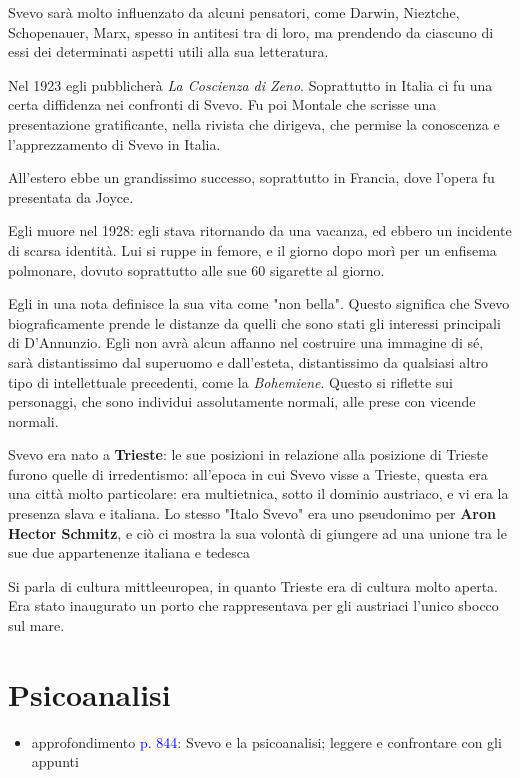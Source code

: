 \documentclass[a4paper, twoside, titlepage]{book}
\newcommand{\elenco}[1]{%
\begin{itemize}
#1
\end{itemize}}
\renewcommand{\emph}[1]{\textcolor{blue}{#1}}
\begin{document}
Svevo sarà molto influenzato da alcuni pensatori, come Darwin, Nieztche, Schopenauer, Marx, spesso in antitesi tra di loro, ma prendendo da ciascuno di essi dei determinati aspetti utili alla sua letteratura.

Nel 1923 egli pubblicherà \textit{La Coscienza di Zeno}. Soprattutto in Italia ci fu una certa diffidenza nei confronti di Svevo. Fu poi Montale che scrisse una presentazione gratificante, nella rivista che dirigeva, che permise la conoscenza e l'apprezzamento di Svevo in Italia.

All'estero ebbe un grandissimo successo, soprattutto in Francia, dove l'opera fu presentata da Joyce.

Egli muore nel 1928: egli stava ritornando da una vacanza, ed ebbero un incidente di scarsa identità. Lui si ruppe in femore, e il giorno dopo morì per un enfisema polmonare, dovuto soprattutto alle sue 60 sigarette al giorno.

Egli in una nota definisce la sua vita come "non bella". Questo significa che Svevo biograficamente prende le distanze da quelli che sono stati gli interessi principali di D'Annunzio.
Egli non avrà alcun affanno nel costruire una immagine di sé, sarà distantissimo dal superuomo e dall'esteta, distantissimo da qualsiasi altro tipo di intellettuale precedenti, come la \textit{Bohemiene}. Questo si riflette sui personaggi, che sono individui assolutamente normali, alle prese con vicende normali.

Svevo era nato a \textbf{Trieste}: le sue posizioni in relazione alla posizione di Trieste furono quelle di irredentismo: all'epoca in cui Svevo visse a Trieste, questa era una città molto particolare: era multietnica, sotto il dominio austriaco, e vi era la presenza slava e italiana. Lo stesso "Italo Svevo" era uno pseudonimo per \textbf{Aron Hector Schmitz}, e ciò ci mostra la sua volontà di giungere ad una unione tra le sue due appartenenze italiana e tedesca

Si parla di cultura mittleeuropea, in quanto Trieste era di cultura molto aperta. Era stato inaugurato un porto che rappresentava per gli austriaci l'unico sbocco sul mare.

\section{Psicoanalisi}

\elenco{\item approfondimento \emph{p. 844}: Svevo e la psicoanalisi; leggere e confrontare con gli appunti}
\end{document}
